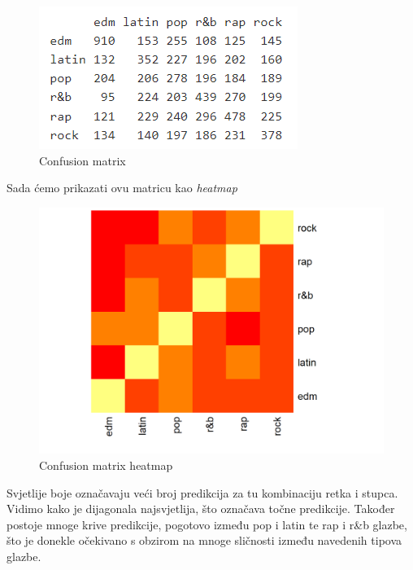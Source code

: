 	\begin{figure}[H]
		\includegraphics[scale=0.9]{slike/confMatrix.png}
		\centering
		\caption{Confusion matrix}
		
	\end{figure}
	
	Sada ćemo prikazati ovu matricu kao \textit{heatmap}
	
	\begin{figure}[H]
		\includegraphics[scale=0.9]{slike/heatmap.png}
		\centering
		\caption{Confusion matrix heatmap}
		
	\end{figure}
	Svjetlije boje označavaju veći broj predikcija za tu kombinaciju retka i stupca. Vidimo kako je dijagonala najsvjetlija, što označava točne predikcije. Također postoje mnoge krive predikcije, pogotovo između pop i latin te rap i r\&b glazbe, što je donekle očekivano s obzirom na mnoge sličnosti između navedenih tipova glazbe.
	
\eject



